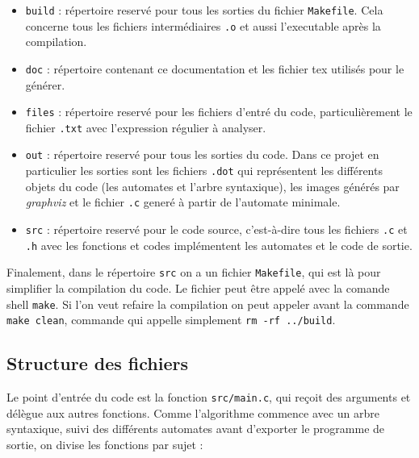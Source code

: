 \documentclass[12pt]{article}
\begin{document}
\begin{itemize}
  \item \texttt{build} : répertoire reservé pour tous les sorties du fichier \texttt{Makefile}. Cela concerne tous les fichiers intermédiaires \texttt{.o} et aussi l'executable après la compilation.
  \item \texttt{doc} : répertoire contenant ce documentation et les fichier tex utilisés pour le générer.
  \item \texttt{files} : répertoire reservé pour les fichiers d'entré du code, particulièrement le fichier \texttt{.txt} avec l'expression régulier à analyser. 
  \item \texttt{out} : répertoire reservé pour tous les sorties du code. Dans ce projet en particulier les sorties sont les fichiers \texttt{.dot} qui représentent les différents objets du code (les automates et l'arbre syntaxique), les images générés par \textit{graphviz} et le fichier \texttt{.c} generé à partir de l'automate minimale.
  \item \texttt{src} : répertoire reservé pour le code source, c'est-à-dire tous les fichiers \texttt{.c} et \texttt{.h} avec les fonctions et codes implémentent les automates et le code de sortie.
\end{itemize}

Finalement, dans le répertoire \texttt{src} on a un fichier \texttt{Makefile}, qui est là pour simplifier la compilation du code. Le fichier peut être appelé avec la comande shell \texttt{make}. Si l'on veut refaire la compilation on peut appeler avant la commande \texttt{make clean}, commande qui appelle simplement \texttt{rm -rf ../build}.

\subsection{Structure des fichiers}
Le point d'entrée du code est la fonction \texttt{src/main.c}, qui reçoit des arguments et délègue aux autres fonctions. Comme l'algorithme commence avec un arbre syntaxique, suivi des différents automates avant d'exporter le programme de sortie, on divise les fonctions par sujet :
\end{document}
